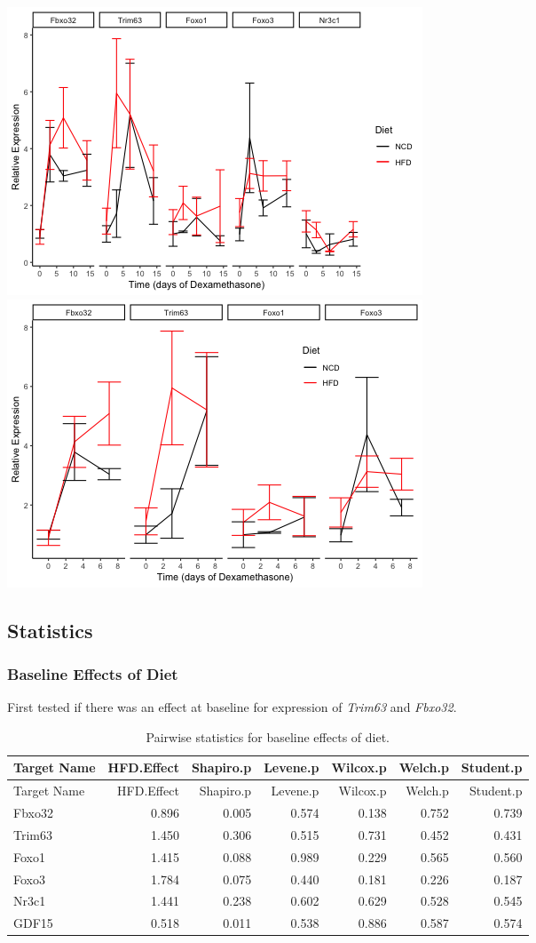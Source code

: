 \documentclass[]{article}
\begin{document}
\includegraphics{figures/lineplot-atrogenes-1.png}
\includegraphics{figures/lineplot-atrogenes-2.png}

\subsection{Statistics}\label{statistics}

\subsubsection{Baseline Effects of Diet}\label{baseline-effects-of-diet}

First tested if there was an effect at baseline for expression of
\emph{Trim63} and \emph{Fbxo32}.

\begin{longtable}[]{@{}lrrrrrr@{}}
\caption{Pairwise statistics for baseline effects of
diet.}\tabularnewline
\toprule
Target Name & HFD.Effect & Shapiro.p & Levene.p & Wilcox.p & Welch.p &
Student.p\tabularnewline
\midrule
\endfirsthead
\toprule
Target Name & HFD.Effect & Shapiro.p & Levene.p & Wilcox.p & Welch.p &
Student.p\tabularnewline
\midrule
\endhead
Fbxo32 & 0.896 & 0.005 & 0.574 & 0.138 & 0.752 & 0.739\tabularnewline
Trim63 & 1.450 & 0.306 & 0.515 & 0.731 & 0.452 & 0.431\tabularnewline
Foxo1 & 1.415 & 0.088 & 0.989 & 0.229 & 0.565 & 0.560\tabularnewline
Foxo3 & 1.784 & 0.075 & 0.440 & 0.181 & 0.226 & 0.187\tabularnewline
Nr3c1 & 1.441 & 0.238 & 0.602 & 0.629 & 0.528 & 0.545\tabularnewline
GDF15 & 0.518 & 0.011 & 0.538 & 0.886 & 0.587 & 0.574\tabularnewline
\bottomrule
\end{longtable}
\end{document}
